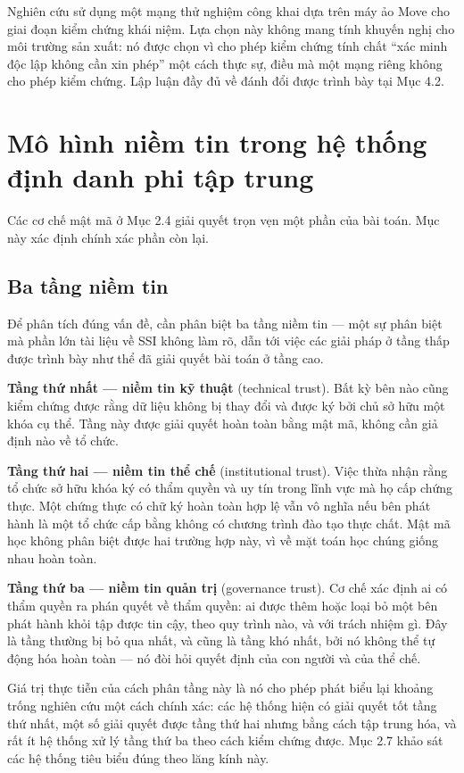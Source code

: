 Nghiên cứu sử dụng một mạng thử nghiệm công khai dựa trên máy ảo Move \cite{Movement2024} cho giai đoạn kiểm chứng khái niệm. Lựa chọn này không mang tính khuyến nghị cho môi trường sản xuất: nó được chọn vì cho phép kiểm chứng tính chất {``}xác minh độc lập không cần xin phép{''} một cách thực sự, điều mà một mạng riêng không cho phép kiểm chứng. Lập luận đầy đủ về đánh đổi được trình bày tại Mục 4.2.

\section{Mô hình niềm tin trong hệ thống định danh phi tập trung}

Các cơ chế mật mã ở Mục 2.4 giải quyết trọn vẹn một phần của bài toán. Mục này xác định chính xác phần còn lại.

\subsection{Ba tầng niềm tin}

Để phân tích đúng vấn đề, cần phân biệt ba tầng niềm tin --- một sự phân biệt mà phần lớn tài liệu về SSI không làm rõ, dẫn tới việc các giải pháp ở tầng thấp được trình bày như thể đã giải quyết bài toán ở tầng cao.

\textbf{Tầng thứ nhất --- niềm tin kỹ thuật} (technical trust). Bất kỳ bên nào cũng kiểm chứng được rằng dữ liệu không bị thay đổi và được ký bởi chủ sở hữu một khóa cụ thể. Tầng này được giải quyết hoàn toàn bằng mật mã, không cần giả định nào về tổ chức.

\textbf{Tầng thứ hai --- niềm tin thể chế} (institutional trust). Việc thừa nhận rằng tổ chức sở hữu khóa ký có thẩm quyền và uy tín trong lĩnh vực mà họ cấp chứng thực. Một chứng thực có chữ ký hoàn toàn hợp lệ vẫn vô nghĩa nếu bên phát hành là một tổ chức cấp bằng không có chương trình đào tạo thực chất. Mật mã học không phân biệt được hai trường hợp này, vì về mặt toán học chúng giống nhau hoàn toàn.

\textbf{Tầng thứ ba --- niềm tin quản trị} (governance trust). Cơ chế xác định ai có thẩm quyền ra phán quyết về thẩm quyền: ai được thêm hoặc loại bỏ một bên phát hành khỏi tập được tin cậy, theo quy trình nào, và với trách nhiệm gì. Đây là tầng thường bị bỏ qua nhất, và cũng là tầng khó nhất, bởi nó không thể tự động hóa hoàn toàn --- nó đòi hỏi quyết định của con người và của thể chế.

Giá trị thực tiễn của cách phân tầng này là nó cho phép phát biểu lại khoảng trống nghiên cứu một cách chính xác: các hệ thống hiện có giải quyết tốt tầng thứ nhất, một số giải quyết được tầng thứ hai nhưng bằng cách tập trung hóa, và rất ít hệ thống xử lý tầng thứ ba theo cách kiểm chứng được. Mục 2.7 khảo sát các hệ thống tiêu biểu đúng theo lăng kính này.

